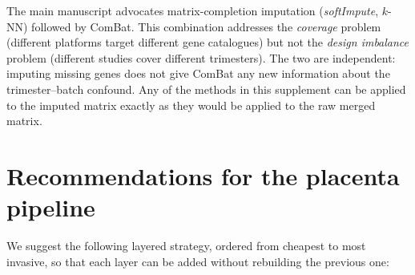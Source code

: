 \documentclass[11pt,a4paper]{article}
\begin{document}
The main manuscript advocates matrix-completion imputation
(\textit{softImpute}, $k$-NN) followed by ComBat. This combination
addresses the \emph{coverage} problem (different platforms target
different gene catalogues) but not the \emph{design imbalance}
problem (different studies cover different trimesters). The two
are independent: imputing missing genes does not give ComBat any
new information about the trimester--batch confound. Any of the
methods in this supplement can be applied to the imputed matrix
exactly as they would be applied to the raw merged matrix.

\section{Recommendations for the placenta pipeline}

We suggest the following layered strategy, ordered from cheapest to
most invasive, so that each layer can be added without rebuilding
the previous one:
\end{document}
